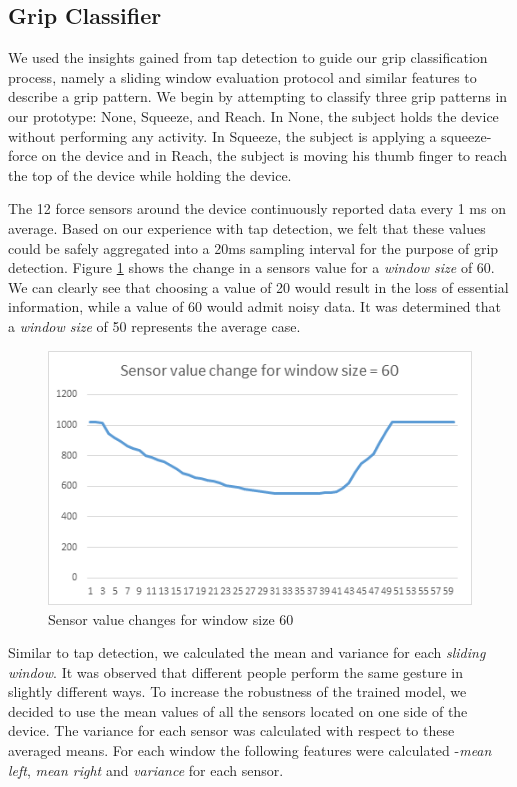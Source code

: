 \subsection{Grip Classifier}
We used the insights gained from tap detection to guide our grip classification process, namely a sliding window evaluation protocol and similar features to describe a grip pattern. We begin by attempting to classify three grip patterns in our prototype: None, Squeeze, and Reach. In None, the subject holds the device without performing any activity. In Squeeze, the subject is applying a squeeze-force on the device and in Reach, the subject is moving his thumb finger to reach the top of the device while holding the device.  
\par
The 12 force sensors around the device continuously reported data every 1 ms on average. Based on our experience with tap detection, we felt that these values could be safely aggregated into a 20ms sampling interval for the purpose of grip detection. Figure \ref{fig:window_60} shows the change in a sensors value for a \textit{window size} of 60. We can clearly see that choosing a value of 20 would result in the loss of essential information, while a value of 60 would admit noisy data. It was determined that a \textit{window size} of 50 represents the average case.

\begin{figure}[h]
\includegraphics[width=.45\textwidth]{window_60.png}
\caption{Sensor value changes for window size 60}
\label{fig:window_60}
\end{figure}

\par
Similar to tap detection, we calculated the mean and variance for each \textit{sliding window}. It was observed that different people perform the same gesture in slightly different ways. To increase the robustness of the trained model, we decided to use the mean values of all the sensors located on one side of the device. The variance for each sensor was calculated with respect to these averaged means. For each window the following features were calculated -\textit{mean left}, \textit{mean right} and \textit{variance} for each sensor.


